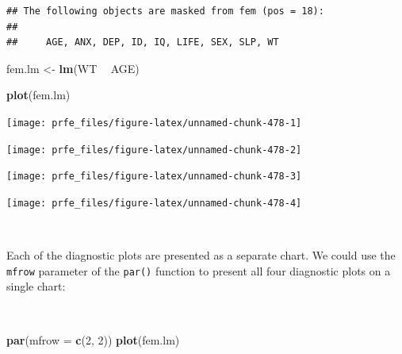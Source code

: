 \documentclass[12pt,a4paper]{book}
\newenvironment{Shaded}{\begin{snugshade}}{\end{snugshade}}
\newcommand{\DataTypeTok}[1]{\textcolor[rgb]{0.13,0.29,0.53}{#1}}
\newcommand{\DecValTok}[1]{\textcolor[rgb]{0.00,0.00,0.81}{#1}}
\newcommand{\KeywordTok}[1]{\textcolor[rgb]{0.13,0.29,0.53}{\textbf{#1}}}
\newcommand{\NormalTok}[1]{#1}
\newcommand{\OperatorTok}[1]{\textcolor[rgb]{0.81,0.36,0.00}{\textbf{#1}}}
\newcommand{\StringTok}[1]{\textcolor[rgb]{0.31,0.60,0.02}{#1}}
\theoremstyle{definition}
\theoremstyle{definition}
\theoremstyle{definition}
\theoremstyle{remark}
\begin{document}
\begin{verbatim}
## The following objects are masked from fem (pos = 18):
## 
##     AGE, ANX, DEP, ID, IQ, LIFE, SEX, SLP, WT
\end{verbatim}

\begin{Shaded}
\begin{Highlighting}[]
\NormalTok{fem.lm <-}\StringTok{ }\KeywordTok{lm}\NormalTok{(WT }\OperatorTok{~}\StringTok{ }\NormalTok{AGE)}
\end{Highlighting}
\end{Shaded}

\newpage

\begin{Shaded}
\begin{Highlighting}[]
\KeywordTok{plot}\NormalTok{(fem.lm)}
\end{Highlighting}
\end{Shaded}

\begin{center}\texttt{[image: prfe\_files/figure-latex/unnamed-chunk-478-1]} \end{center}

\begin{center}\texttt{[image: prfe\_files/figure-latex/unnamed-chunk-478-2]} \end{center}

\begin{center}\texttt{[image: prfe\_files/figure-latex/unnamed-chunk-478-3]} \end{center}

\begin{center}\texttt{[image: prfe\_files/figure-latex/unnamed-chunk-478-4]} \end{center}

~

Each of the diagnostic plots are presented as a separate chart. We could
use the \texttt{mfrow} parameter of the \texttt{par()} function to
present all four diagnostic plots on a single chart:

~

\begin{Shaded}
\begin{Highlighting}[]
\KeywordTok{par}\NormalTok{(}\DataTypeTok{mfrow =} \KeywordTok{c}\NormalTok{(}\DecValTok{2}\NormalTok{, }\DecValTok{2}\NormalTok{))}
\KeywordTok{plot}\NormalTok{(fem.lm)}
\end{Highlighting}
\end{Shaded}
\end{document}
